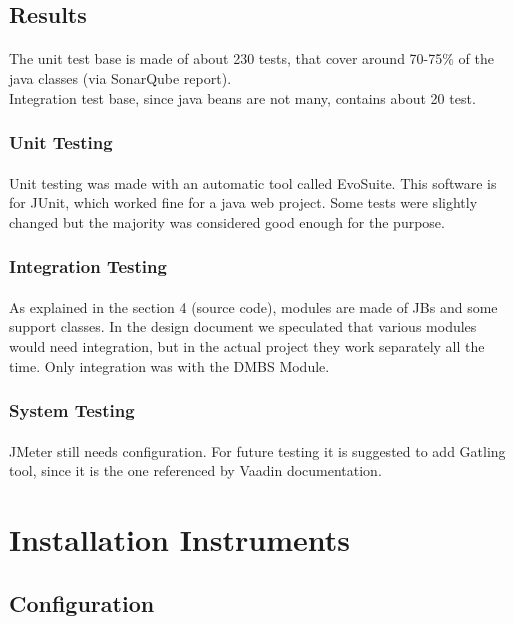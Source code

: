 \documentclass{article}
\begin{document}
		\subsection{Results}
		\paragraph{}The unit test base is made of about 230 tests, that cover around 70-75\% of the java classes (via SonarQube report).\\ Integration test base, since java beans are not many, contains about 20 test.
			\subsubsection{Unit Testing}
			\paragraph{}Unit testing was made with an automatic tool called EvoSuite. This software is for JUnit, which worked fine for a java web project. Some tests were slightly changed but the majority was considered good enough for the purpose.
			\subsubsection{Integration Testing}
			\paragraph{}As explained in the section 4 (source code), modules are made of JBs and some support classes. In the design document we speculated that various modules would need integration, but in the actual project they work separately all the time. Only integration was with the DMBS Module.
			\subsubsection{System Testing}
			\paragraph{}JMeter still needs configuration. For future testing it is suggested to add Gatling tool, since it is the one referenced by Vaadin documentation.
\newpage
	\section{Installation Instruments}
		\subsection{Configuration}
\end{document}
